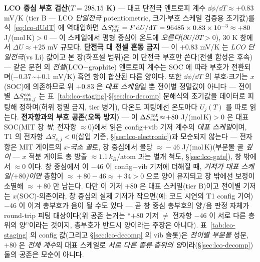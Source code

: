 \begin{verifybox}
\textbf{LCO 중심 부호 검산($T=298.15$ K)} --- 대표 단전극 엔트로피 계수 $\dd\phi/\dd T\approx+0.83$ mV/K\cite{swiderska2019}
(tier B --- LCO \emph{단일전극} potentiometric, 크기$\cdot$부호 스케일 검증용 초기값)를 식~\eqref{eq:lco-dUdT}
에 역대입하면 $\Delta S_{\mathrm{rxn}}^\mathrm{cat}=F\,\mathrm{d} U/\mathrm{d} T=96485\times0.83\times10^{-3}\approx+80$ J/(mol\,K)$>0$ ---
이 스케일에서 평형 중심이 온도에 \emph{오른다}($\partial U/\partial T>0$), $30$ K 창에서 $\Delta U\approx+25$ mV 규모다.
\textbf{단전극 대 전셀 혼동 금지} --- 이 $+0.83$ mV/K 는 \emph{LCO 단일전극}(vs Li) 값이고 본 장(하프셀
범위)은 이 단전극 부호만 쓴다(전셀 합성은 후속) --- 같은 문헌\cite{swiderska2019} 의 \emph{전셀}(LCO$-$graphite) 엔트로피 계수는
SOC 에 따라 부호가 전환되며($-0.37$\,\textasciitilde$+0.1$ mV/K) 흑연 항이 합산된 다른 양이다. 또한
$\dd\phi/\dd T$ 의 부호$\cdot$크기는 $x$(SOC)에 의존하므로 위 $+0.83$ 은 \emph{대표 스케일}일 뿐 전이별
정밀값이 아니다 --- 전이별 $\Delta S_{\mathrm{rxn},j}^\mathrm{cat}$ 는 표~\ref{tab:lco-staging}$\cdot$\S\ref{sec:lco-decomp}
분해식의 초기값을 데이터로 피팅해 정하며(허위 정밀 금지, tier 병기), 다온도 피팅에선 온도마다 $U_j(T)$ 를 따로 읽는다.
\textbf{전자항과의 부호 공존(오독 방지)} --- 이 $\Delta S_{\mathrm{rxn}}^\mathrm{cat}\!\approx\!+80$ J/(mol\,K)$>0$ 은
대표 SOC(MIT 창 \emph{밖}, 전자항 $\approx\!0$)에서 읽은 config$+$vib 기저 계수의 \emph{대표 스케일}이며,
T1 의 전자항 $\Delta S_{e,j}<0$(삽입 기준, \S\ref{sec:lco-electronic})과 모순되지 않는다 --- 전자항은 MIT 게이트의
$x$-\emph{국소 골}로, 창 중심에서 몰당 $\approx\!-46$ J/(mol\,K)(부분몰 골 \emph{깊이} --- $x$ 적분 게이트 총 방출 $\approx\!1.1\,k_B$/atom 과는 별개 척도,
\S\ref{sec:lco-gate}), 창 밖에서 $\approx\!0$ 이다. 창 중심에서 이 $-46$ 이 config$+$vib 기저에 더해질 때, \emph{기저가 대표 스케일($+80$)이면} 총합이 $\approx\!+80-46\approx\!+34>0$ 으로
양이 유지되고 창 밖에선 보정이 소멸해 $\approx\!+80$ 만 남는다. 다만 이 기저 $+80$ 은 대표 스케일(tier B)이고
전이별 기저는 $x$(SOC)-의존이라, 창 중심의 실제 기저가 작으면(예: 코드 시연의 T1 config 기여) $-46$ 이 이겨 총부호가
음이 될 수도 있다 --- 곧 창 중심 총부호의 양/음 판정 자체가 round-trip 피팅 대상이다(위 공존 논거는 ``$+80$
기저 $\ne$ 전자항 $-46$ 이 서로 다른 층위의 양''이라는 것이지, 총부호가 반드시 양이라는 주장은 아니다). 표~\ref{tab:lco-staging}
의 config 값(그리고 \S\ref{sec:lco-decomp} 의 vib 슬롯)은 \emph{전이별 부분몰} 성분, $+80$ 은 \emph{전체 계수}의 대표 스케일로 \emph{서로 다른
종류$\cdot$층위의 양}이라(\S\ref{sec:lco-decomp}) 둘의 공존은 모순이 아니다.
\end{verifybox}

